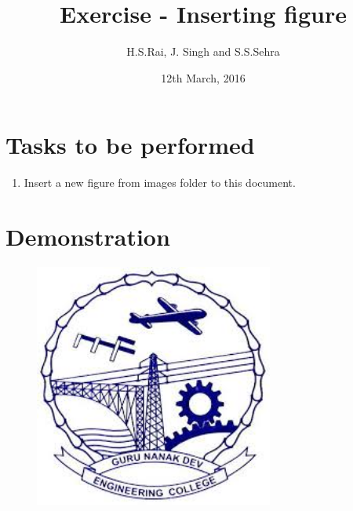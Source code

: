 \documentclass{article}
\title{Exercise - Inserting figure}
\author{H.S.Rai, J. Singh and S.S.Sehra}
\date{12th March, 2016}
\begin{document}
\maketitle	
\section*{Tasks to be performed}
\begin{enumerate}	
\item Insert a new figure from images folder to this document.
\end{enumerate}
\section*{Demonstration}
\begin{figure}[tbph]
\centering
\includegraphics[width=0.7\textwidth]{../../images/gnelogo}
\caption{}
\label{fig:gnelogo}
\end{figure}
\end{document}
